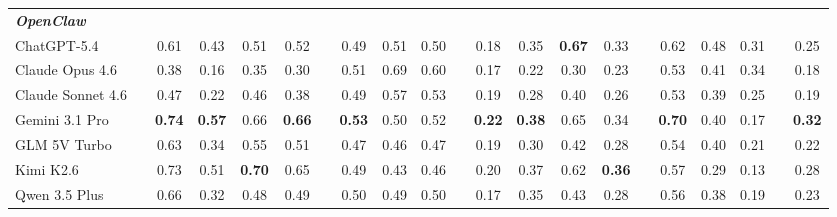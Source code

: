\begin{table}[t]
{\begin{tabular}{@{}l c cccc c ccc c cccc c ccc c c@{}}
    \hline
    
    \rowcolor{GroupGreen}
    \textit{\textbf{OpenClaw}}
    & \vsep
    & \multicolumn{4}{c}{}
    & \vsep
    & \multicolumn{3}{c}{}
    & \vsep
    & \multicolumn{4}{c}{}
    & \vsep
    & \multicolumn{3}{c}{}
    & \vsep
    & \\
    
    ChatGPT-5.4
    & \vsep
    & 0.61 & 0.43 & 0.51 & 0.52
    & \vsep
    & 0.49 & 0.51 & 0.50
    & \vsep
    & 0.18 & 0.35 & \textbf{0.67} & 0.33
    & \vsep
    & 0.62 & 0.48 & 0.31
    & \vsep
    & 0.25 \\
    
    Claude Opus 4.6
    & \vsep
    & 0.38 & 0.16 & 0.35 & 0.30
    & \vsep
    & 0.51 & 0.69 & 0.60
    & \vsep
    & 0.17 & 0.22 & 0.30 & 0.23
    & \vsep
    & 0.53 & 0.41 & 0.34
    & \vsep
    & 0.18 \\
    
    Claude Sonnet 4.6
    & \vsep
    & 0.47 & 0.22 & 0.46 & 0.38
    & \vsep
    & 0.49 & 0.57 & 0.53
    & \vsep
    & 0.19 & 0.28 & 0.40 & 0.26
    & \vsep
    & 0.53 & 0.39 & 0.25
    & \vsep
    & 0.19 \\
    
    Gemini 3.1 Pro
    & \vsep
    & \textbf{0.74} & \textbf{0.57} & 0.66 & \textbf{0.66}
    & \vsep
    & \textbf{0.53} & 0.50 & 0.52
    & \vsep
    & \textbf{0.22} & \textbf{0.38} & 0.65 & 0.34
    & \vsep
    & \textbf{0.70} & 0.40 & 0.17
    & \vsep
    & \textbf{0.32} \\
    
    GLM 5V Turbo
    & \vsep
    & 0.63 & 0.34 & 0.55 & 0.51
    & \vsep
    & 0.47 & 0.46 & 0.47
    & \vsep
    & 0.19 & 0.30 & 0.42 & 0.28
    & \vsep
    & 0.54 & 0.40 & 0.21
    & \vsep
    & 0.22 \\
    
    Kimi K2.6
    & \vsep
    & 0.73 & 0.51 & \textbf{0.70} & 0.65
    & \vsep
    & 0.49 & 0.43 & 0.46
    & \vsep
    & 0.20 & 0.37 & 0.62 & \textbf{0.36}
    & \vsep
    & 0.57 & 0.29 & 0.13
    & \vsep
    & 0.28 \\
    
    Qwen 3.5 Plus
    & \vsep
    & 0.66 & 0.32 & 0.48 & 0.49
    & \vsep
    & 0.50 & 0.49 & 0.50
    & \vsep
    & 0.17 & 0.35 & 0.43 & 0.28
    & \vsep
    & 0.56 & 0.38 & 0.19
    & \vsep
    & 0.23 \\
    
    \hline
    

\end{tabular}}
\end{table}
